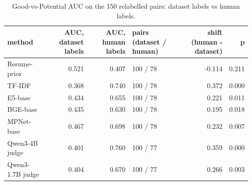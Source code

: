 \begin{table}
\caption{Good-vs-Potential AUC on the 150 relabelled pairs: dataset labels vs human labels.}
\label{tab:t6_good_vs_potential}
\begin{tabular}{lrrlrr}
\toprule
method & AUC, dataset labels & AUC, human labels & pairs (dataset / human) & shift (human - dataset) & p \\
\midrule
Resume-prior & 0.521 & 0.407 & 100 / 78 & -0.114 & 0.211 \\
TF-IDF & 0.368 & 0.740 & 100 / 78 & 0.372 & 0.000 \\
E5-base & 0.434 & 0.655 & 100 / 78 & 0.221 & 0.011 \\
BGE-base & 0.435 & 0.630 & 100 / 78 & 0.195 & 0.018 \\
MPNet-base & 0.467 & 0.698 & 100 / 78 & 0.232 & 0.007 \\
Qwen3-4B judge & 0.401 & 0.760 & 100 / 77 & 0.359 & 0.000 \\
Qwen3-1.7B judge & 0.404 & 0.670 & 100 / 77 & 0.266 & 0.003 \\
\bottomrule
\end{tabular}
\end{table}
